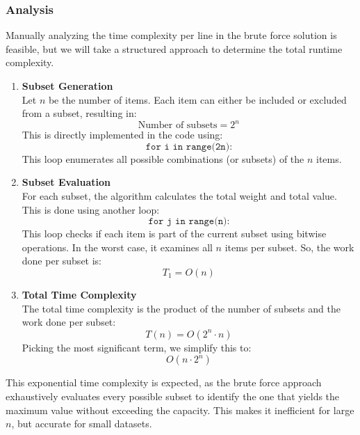 \subsubsection{Analysis}


Manually analyzing the time complexity per line in the brute force solution is feasible, but we will take a structured approach to determine the total runtime complexity.

\begin{enumerate}[label=\textbf{\arabic*.}]
    \item \textbf{Subset Generation} \\
    Let $n$ be the number of items. Each item can either be included or excluded from a subset, resulting in:
    \[
        \text{Number of subsets} = 2^n
    \]
    This is directly implemented in the code using:
    \[
        \texttt{for i in range(2\^{}n):}
    \]
    This loop enumerates all possible combinations (or subsets) of the $n$ items.

    \item \textbf{Subset Evaluation} \\
    For each subset, the algorithm calculates the total weight and total value. This is done using another loop:
    \[
        \texttt{for j in range(n):}
    \]
    This loop checks if each item is part of the current subset using bitwise operations. In the worst case, it examines all $n$ items per subset. So, the work done per subset is:
    \[
        T_1 = O(n)
    \]

    \item \textbf{Total Time Complexity} \\
    The total time complexity is the product of the number of subsets and the work done per subset:
    \[
        T(n) = O(2^n \cdot n)
    \]
    Picking the most significant term, we simplify this to:
    \[
        \boxed{O(n \cdot 2^n)}
    \]
\end{enumerate}

This exponential time complexity is expected, as the brute force approach exhaustively evaluates every possible subset to identify the one that yields the maximum value without exceeding the capacity. This makes it inefficient for large $n$, but accurate for small datasets.
